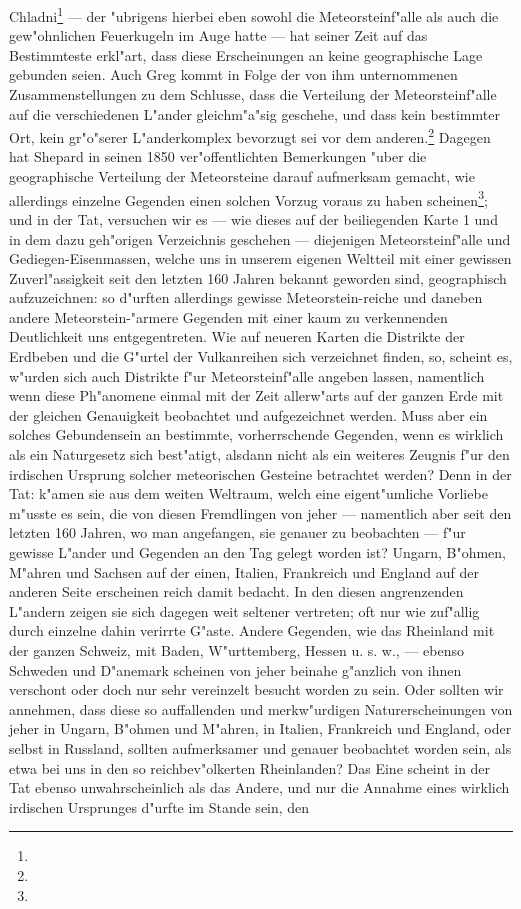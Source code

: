 \documentclass[a4paper, 8pt, oneside, polutonikogreek, german]{article}
\begin{document}
Chladni\footnote{} --- der "ubrigens hierbei eben sowohl die Meteorsteinf"alle als auch die gew"ohnlichen Feuerkugeln im Auge hatte --- hat seiner Zeit auf das Bestimmteste erkl"art, dass diese Erscheinungen an keine geographische Lage gebunden seien. Auch Greg kommt in Folge der von ihm unternommenen Zusammenstellungen zu dem Schlusse, dass die Verteilung der Meteorsteinf"alle auf die verschiedenen L"ander gleichm"a"sig geschehe, und dass kein bestimmter Ort, kein gr"o"serer L"anderkomplex bevorzugt sei vor dem anderen.\footnote{} Dagegen hat Shepard in seinen 1850 ver"offentlichten Bemerkungen "uber die geographische Verteilung der Meteorsteine darauf aufmerksam gemacht, wie allerdings einzelne Gegenden einen solchen Vorzug voraus zu haben scheinen\footnote{}; und in der Tat, versuchen wir es --- wie dieses auf der beiliegenden Karte 1 und in dem dazu geh"origen Verzeichnis geschehen --- diejenigen Meteorsteinf"alle und Gediegen-Eisenmassen, welche uns in unserem eigenen Weltteil mit einer gewissen Zuverl"assigkeit seit den letzten 160 Jahren bekannt geworden sind, geographisch aufzuzeichnen: so d"urften allerdings gewisse Meteorstein-reiche und daneben andere Meteorstein-"armere Gegenden mit einer kaum zu verkennenden Deutlichkeit uns entgegentreten. Wie auf neueren Karten die Distrikte der Erdbeben und die G"urtel der Vulkanreihen sich verzeichnet finden, so, scheint es, w"urden sich auch Distrikte f"ur Meteorsteinf"alle angeben lassen, namentlich wenn diese Ph"anomene einmal mit der Zeit allerw"arts auf der ganzen Erde mit der gleichen Genauigkeit beobachtet und aufgezeichnet werden. Muss aber ein solches Gebundensein an bestimmte, vorherrschende Gegenden, wenn es wirklich als ein Naturgesetz sich best"atigt, alsdann nicht als ein weiteres Zeugnis f"ur den irdischen Ursprung solcher meteorischen Gesteine betrachtet werden? Denn in der Tat: k"amen sie aus dem weiten Weltraum, welch eine eigent"umliche Vorliebe m"usste es sein, die von diesen Fremdlingen von jeher --- namentlich aber seit den letzten 160 Jahren, wo man angefangen, sie genauer zu beobachten --- f"ur gewisse L"ander und Gegenden an den Tag gelegt worden ist? Ungarn, B"ohmen, M"ahren und Sachsen auf der einen, Italien, Frankreich und England auf der anderen Seite erscheinen reich damit bedacht. In den diesen angrenzenden L"andern zeigen sie sich dagegen weit seltener vertreten; oft nur wie zuf"allig durch einzelne dahin verirrte G"aste. Andere Gegenden, wie das Rheinland mit der ganzen Schweiz, mit Baden, W"urttemberg, Hessen u. s. w., --- ebenso Schweden und D"anemark scheinen von jeher beinahe g"anzlich von ihnen verschont oder doch nur sehr vereinzelt besucht worden zu sein. Oder sollten wir annehmen, dass diese so auffallenden und merkw"urdigen Naturerscheinungen von jeher in Ungarn, B"ohmen und M"ahren, in Italien, Frankreich und England, oder selbst in Russland, sollten aufmerksamer und genauer beobachtet worden sein, als etwa bei uns in den so reichbev"olkerten Rheinlanden? Das Eine scheint in der Tat ebenso unwahrscheinlich als das Andere, und nur die Annahme eines wirklich irdischen Ursprunges d"urfte im Stande sein, den 
\end{document}
